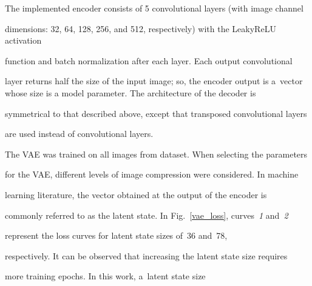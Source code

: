 \noindent

The implemented encoder consists of 5 convolutional layers (with image channel 

dimensions: 32, 64, 128, 256, and 512, respectively) with the LeakyReLU activation 

function and batch normalization after each layer. Each output convolutional 

layer returns half the size of the input image; so, the encoder output is a~vector whose size is a model parameter. The architecture of the decoder is 

symmetrical to that described above, except that transposed convolutional layers 

are used instead of convolutional layers.





The VAE was trained on all images from dataset. When selecting the parameters 

for the VAE, different levels of image compression were considered. In machine 

learning literature, the vector obtained at the output of the encoder is 

commonly referred to as the latent state. In Fig.~\ref{vae_loss}, curves~\textit{1} and~\textit{2}

 represent the loss curves for latent state sizes of~36 and~78, 

respectively. It can be observed that increasing the latent state size requires 

more training epochs. In this work, a~latent state size\linebreak\vspace*{-12pt}



\pagebreak



\



\vspace*{-12pt}






